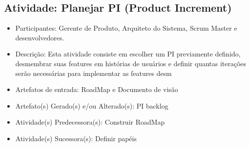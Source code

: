 \subsection{Atividade: Planejar PI (Product Increment)}
\begin{itemize}
\item Participantes: Gerente de Produto, Arquiteto do Sistema, Scrum Master e desenvolvedores.

\item Descrição: Esta atividade consiste em escolher um PI previamente definido, desmembrar suas features em histórias de usuários e definir quantas iterações serão necessárias para implementar as features desm

\item Artefatos de entrada: RoadMap e Documento de visão

\item Artefato(s) Gerado(s) e/ou Alterado(s): PI backlog

\item Atividade(s) Predecessora(s): Construir RoadMap
  
\item Atividade(s) Sucessora(s): Definir papéis
\end{itemize}



